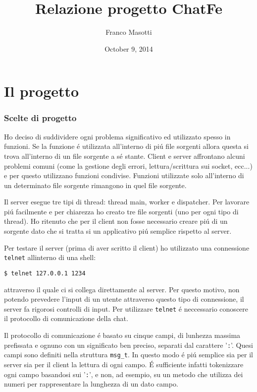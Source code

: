 \documentclass[12pt a4paper oneside]{article}
\title{Relazione progetto ChatFe}
\author{Franco Masotti}
\date{October 9, 2014}
\begin{document}
	\maketitle
	\tableofcontents
	\newpage
	\part{Il progetto}
		\section{Scelte di progetto}
			\par
			Ho deciso di suddividere ogni problema significativo ed utilizzato spesso in funzioni. Se la funzione \'e utilizzata all'interno di pi\'u file sorgenti allora questa si trova all'interno di un file sorgente a s\'e stante. Client e server affrontano alcuni problemi comuni (come la gestione degli errori, lettura/scrittura sui socket, ecc...) e per questo utilizzano funzioni condivise. Funzioni utilizzate solo all'interno di un determinato file sorgente rimangono in quel file sorgente.
			\par
			Il server esegue tre tipi di thread: thread main, worker e dispatcher. Per lavorare pi\'u facilmente e per chiarezza ho creato tre file sorgenti (uno per ogni tipo di thread). Ho ritenuto che per il client non fosse necessario creare pi\'u di un sorgente dato che si tratta si un applicativo pi\'u semplice rispetto al server.
			\par
			Per testare il server (prima di aver scritto il client) ho utilizzato una connessione \texttt{telnet} allinterno di una shell: \begin{verbatim}$ telnet 127.0.0.1 1234\end{verbatim} attraverso il quale ci si collega direttamente al server. Per questo motivo, non potendo prevedere l'input di un utente attraverso questo tipo di connessione, il server fa rigorosi controlli di input. Per utilizzare \texttt{telnet} \'e neccessario conoscere il protocollo di comunicazione della chat.
			\par
			Il protocollo di comunicazione \'e basato su cinque campi, di lunhezza massima prefissata e ognuno con un significato ben preciso, separati dal carattere '\texttt{:}'. Quesi campi sono definiti nella struttura \texttt{msg\_t}. In questo modo \'e pi\'u semplice sia per il server sia per il client la lettura di ogni campo. \'E sufficiente infatti tokenizzare ogni campo basandosi sui '\texttt{:}', e non, ad esempio, su un metodo che utilizza dei numeri per rappresentare la lunghezza di un dato campo.
\end{document}
